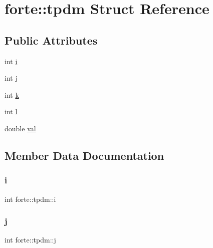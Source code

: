 \hypertarget{structforte_1_1tpdm}{}\section{forte\+:\+:tpdm Struct Reference}
\label{structforte_1_1tpdm}
\subsection*{Public Attributes}
\begin{DoxyCompactItemize}
\item 
int \mbox{\hyperlink{structforte_1_1tpdm_a93ea08969818ebe11e160996e57224d8}{i}}
\item 
int \mbox{\hyperlink{structforte_1_1tpdm_a2b459de5f0eaaa41e65e8f3852d56bbe}{j}}
\item 
int \mbox{\hyperlink{structforte_1_1tpdm_afb20f986ca0fab689652785ab5697b96}{k}}
\item 
int \mbox{\hyperlink{structforte_1_1tpdm_a1c2e8857e6c5c6504afea51539523dc7}{l}}
\item 
double \mbox{\hyperlink{structforte_1_1tpdm_a628b4481e3ab6fedf1dc5e7e3dbacbcf}{val}}
\end{DoxyCompactItemize}


\subsection{Member Data Documentation}
\mbox{\label{structforte_1_1tpdm_a93ea08969818ebe11e160996e57224d8}} 
\subsubsection{\texorpdfstring{i}{i}}
{\footnotesize\ttfamily int forte\+::tpdm\+::i}

\mbox{\label{structforte_1_1tpdm_a2b459de5f0eaaa41e65e8f3852d56bbe}} 
\subsubsection{\texorpdfstring{j}{j}}
{\footnotesize\ttfamily int forte\+::tpdm\+::j}

\mbox{\label{structforte_1_1tpdm_afb20f986ca0fab689652785ab5697b96}} 
